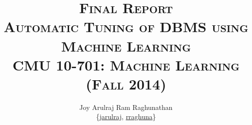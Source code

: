 \documentclass[pageno]{jpaper}
\makeatletter
\newcommand{\email}[1]{\href{mailto:#1@cs.cmu.edu}{#1}}
\makeatother
\begin{document}
\title{
  \textsc{\LARGE Final Report\\
  \Large Automatic Tuning of DBMS using Machine Learning\\
  \large CMU 10-701: Machine Learning (Fall 2014)}
}

\author{Joy Arulraj \hspace{0.1 in} Ram Raghunathan \hspace{0.1 in} \\
{\{\email{jarulraj}, \email{rraghuna}\}}}

\date{}
\maketitle










\balance



\end{document}

